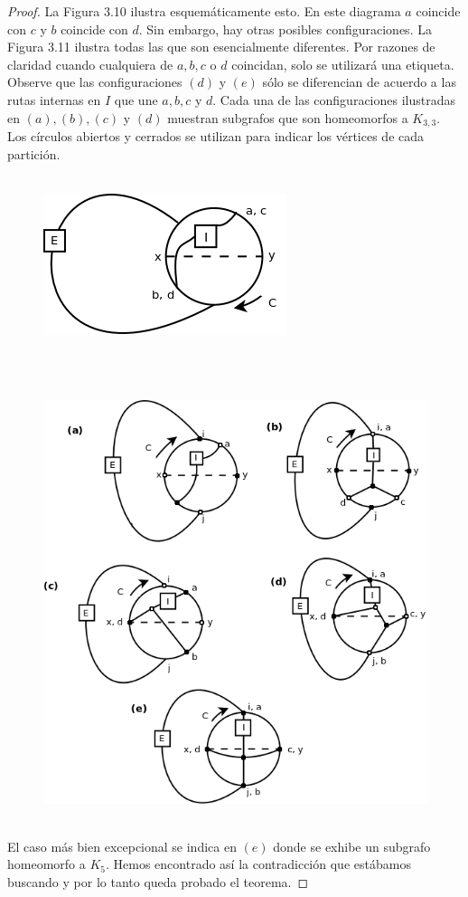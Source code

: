 \documentclass[10pt,a5paper]{book}
\begin{document}
\begin{proof}
La Figura 3.10 ilustra esquemáticamente esto. En este diagrama $a$ coincide con $c$ y $b$ coincide con $d$. Sin embargo, hay otras posibles configuraciones. La Figura 3.11 ilustra todas las que son esencialmente diferentes. Por razones de claridad cuando cualquiera de $a, b, c$ o $d$ coincidan, solo se utilizará una etiqueta. Observe que las configuraciones $(d)$ y $(e)$ sólo se diferencian de acuerdo a las rutas internas en $I$ que une $a, b, c$ y $d$. Cada una de las configuraciones ilustradas en $(a), (b), (c)$ y $(d)$ muestran subgrafos que son homeomorfos a $K_{3,3}$. Los círculos abiertos y cerrados se utilizan para indicar los vértices de cada partición.
\begin{figure}[H]
\caption{ }
\hrulefill{}\\
\hspace*{.7in}\includegraphics[scale=.4]{Fig3_10.png}
\end{figure}
\hrulefill{}\\
\begin{figure}[H]
\caption{ }
\hrulefill{}\\
\hspace*{-.5in}\includegraphics[scale=.4]{Fig3_11.png}
\end{figure}
\hrulefill{}\\
El caso más bien excepcional se indica en $(e)$ donde se exhibe un subgrafo homeomorfo a $K_5$. Hemos encontrado así la contradicción que estábamos buscando y por lo tanto queda probado el teorema.
\end{proof}
\end{document}
